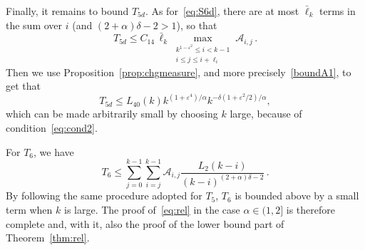 \documentclass[10pt]{amsart}
\theoremstyle{definition}\newtheorem{defi}[theo]{Definition}\newtheorem{rema}[theo]{Remark}\newtheorem{exam}[theo]{Example}\newtheorem{exem}[theo]{Example}\newtheorem{nota}[theo]{Notation}
\newcommand{\ga}{\alpha}
\newcommand{\gd}{\delta}
\newcommand{\gep}{\varepsilon}
\newcommand{\cA}{\ensuremath{\mathcal{A}}}
\newcommand{\maxtwo}[2]{\max_{\substack{#1 \\ #2}}}
\begin{document}
Finally, it remains to bound $T_{5d}$. As for~\eqref{eq:S6d}, there are at most $\bar\ell_k$ terms in the sum over $i$ (and $(2+\ga)\gd-2>1$), so that
\begin{equation}
T_{5d} \le C_{14}\,\bar\ell_{k} \maxtwo{ k^{1- \gep^2} \le i < k-1}{i \le j \le i+ \ell_i} \cA_{i,j}\,.
\end{equation}
Then we use Proposition~\ref{prop:chgmeasure}, and more precisely~\eqref{boundA1}, to get that
\begin{equation}
T_{5d} \le L_{40}(k) k^{(1+\gep^4)/\ga} k^{-\gd (1+\gep^2/2)/ \ga},
\end{equation}
which can be made arbitrarily small by choosing $k$ large, because of condition~\eqref{eq:cond2}.



For $T_6$, we have
\begin{equation}
T_6 \le \sum_{j=0}^{k-1} \sum_{i=j}^{k-1} \cA_{i,j} \frac{L_2(k-i)}{(k-i)^{(2+\ga)\delta -2}}\,.
\end{equation}
By following the same procedure adopted for $T_{5}$, $T_{6}$ is bounded above by a small term when $k$ is large. The proof of~\eqref{eq:rel} in the case $\ga\in(1,2]$ is therefore complete and, with it, also the proof of the lower bound part of Theorem~\ref{thm:rel}.
\end{document}
